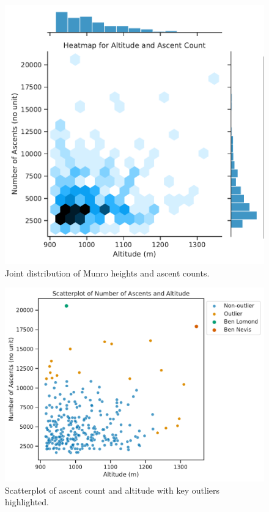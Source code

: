 \documentclass[11pt,a4paper]{article}
\begin{document}
\begin{figure} [h!]
  \centering
  \includegraphics{report/heatmap_joint_distribution.pdf}
  \caption{Joint distribution of Munro heights and ascent counts.}
  \label{fds-project-template:fig:heatmap}
\end{figure}

\medskip 

\begin{figure} [h!]
  \centering
  \includegraphics[scale = 0.7]{report/scatterplot.pdf}
  \caption{Scatterplot of ascent count and altitude with key outliers highlighted.}
  \label{fds-project-template:fig:scatterplot}
\end{figure}
\end{document}
